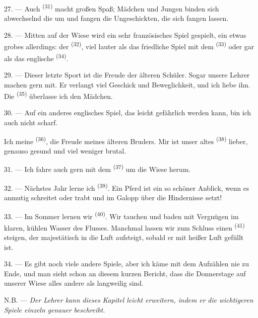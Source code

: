 \VUsaut{5.0mm}
\VUsaut{3.4mm}

27. --- Auch  \textsuperscript{(31)} macht großen Spaß; Mädchen und
Jungen binden sich abwechselnd die  um und fangen die
Ungeschickten, die sich fangen lassen.

28. --- Mitten auf der Wiese wird ein sehr französisches Spiel gespielt, ein etwas
grobes allerdings: der  \textsuperscript{(32)}, viel lauter als das
friedliche Spiel mit dem  \textsuperscript{(33)} oder gar als das
englische  \textsuperscript{(34)}.

29. --- Dieser letzte Sport ist die Freude der älteren Schüler. Sogar unsere Lehrer
machen gern mit. Er verlangt viel Geschick und Beweglichkeit, und ich liebe ihn.
Die  \textsuperscript{(35)} überlasse ich den Mädchen.

30. --- Auf ein anderes englisches Spiel, das leicht gefährlich werden kann, bin
ich auch nicht scharf.

Ich meine  \textsuperscript{(36)}, die Freude meines älteren
Bruders. Mir ist unser altes  \textsuperscript{(38)} lieber, genauso
gesund und viel weniger brutal.

\VUsaut{4.6mm}
\VUsaut{3.0mm}

31. --- Ich fahre auch gern mit dem  \textsuperscript{(37)} um die
Wiese herum.

32. --- Nächstes Jahr lerne ich  \textsuperscript{(39)}. Ein Pferd ist
ein so schöner Anblick, wenn es anmutig schreitet oder trabt und im Galopp über
die Hindernisse setzt!

33. --- Im Sommer lernen wir  \textsuperscript{(40)}. Wir tauchen
und baden mit Vergnügen im klaren, kühlen Wasser des Flusses. Manchmal lassen wir
zum Schluss einen  \textsuperscript{(41)} steigen, der
majestätisch in die Luft aufsteigt, sobald er mit heißer Luft gefüllt ist.

34. --- Es gibt noch viele andere Spiele, aber ich käme mit dem Aufzählen nie zu
Ende, und man sieht schon an diesem kurzen Bericht, dass die Donnerstage auf
unserer Wiese alles andere als langweilig sind.

N.B. --- \textit{Der Lehrer kann dieses Kapitel leicht erweitern, indem er die
wichtigeren Spiele einzeln genauer beschreibt.}
\VUsaut{6.0mm}
\VUfilet{22mm}
